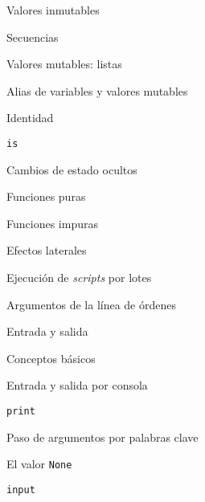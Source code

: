 \begin{longenum}
\begin{longenum}
\begin{longenum}
\begin{longenum}
                \item Valores inmutables
                \begin{longenum}
                    \item Secuencias
                \end{longenum}
                \item Valores mutables: listas
            \end{longenum}
            \item Alias de variables y valores mutables
            \item Identidad
            \begin{longenum}
                \item \texttt{is}
            \end{longenum}
        \end{longenum}
        \item Cambios de estado ocultos
        \begin{longenum}
            \item Funciones puras
            \item Funciones impuras
            \item Efectos laterales
            \item Ejecución de \textit{scripts} por lotes
            \begin{longenum}
                \item Argumentos de la línea de órdenes
            \end{longenum}
        \end{longenum}
        \item Entrada y salida
        \begin{longenum}
            \item Conceptos básicos
            \item Entrada y salida por consola
            \begin{longenum}
                \item \texttt{print}
                \begin{longenum}
                    \item Paso de argumentos por palabras clave
                    \item El valor \texttt{None}
                \end{longenum}
                \item \texttt{input}
            \end{longenum}
        \end{longenum}

\end{longenum}
\end{longenum}
